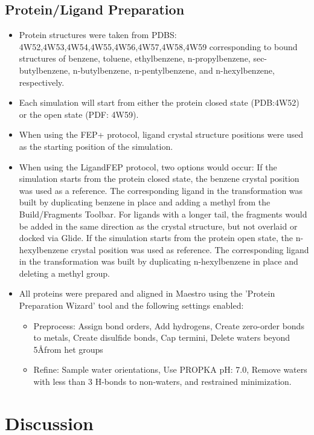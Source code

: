 \documentclass{article}
\begin{document}
\subsection{Protein/Ligand Preparation}
   \begin{itemize}
   \item Protein structures were taken from PDBS: 4W52,4W53,4W54,4W55,4W56,4W57,4W58,4W59 corresponding to bound structures of benzene, toluene, ethylbenzene, n-propylbenzene, sec-butylbenzene, n-butylbenzene, n-pentylbenzene, and n-hexylbenzene, respectively.
   \item Each simulation will start from either the protein closed state (PDB:4W52) or the open state (PDF: 4W59).
   \item When using the FEP+ protocol, ligand crystal structure positions were used as the starting position of the simulation.
   \item When using the LigandFEP protocol, two options would occur:
      If the simulation starts from the protein closed state, the benzene crystal position was used as a reference. 
      The corresponding ligand in the transformation was built by duplicating benzene in place and adding a methyl from the Build/Fragments Toolbar. 
      For ligands with a longer tail, the fragments would be added in the same direction as the crystal structure, but not overlaid or docked via Glide.
      If the simulation starts from the protein open state, the n-hexylbenzene crystal position was used as reference. 
      The corresponding ligand in the transformation was built by duplicating n-hexylbenzene in place and deleting a methyl group.
   \item All proteins were prepared and aligned in Maestro using the 'Protein Preparation Wizard' tool and the following settings enabled:
   \begin{itemize}
      \item Preprocess: Assign bond orders, Add hydrogens, Create zero-order bonds to metals, Create disulfide bonds, Cap termini, Delete waters beyond 5\AA from het groups
      \item Refine: Sample water orientations, Use PROPKA pH: 7.0, Remove waters with less than 3 H-bonds to non-waters, and restrained minimization.
   \end{itemize}
   \end{itemize}
   
\section{Discussion}
\end{document}
